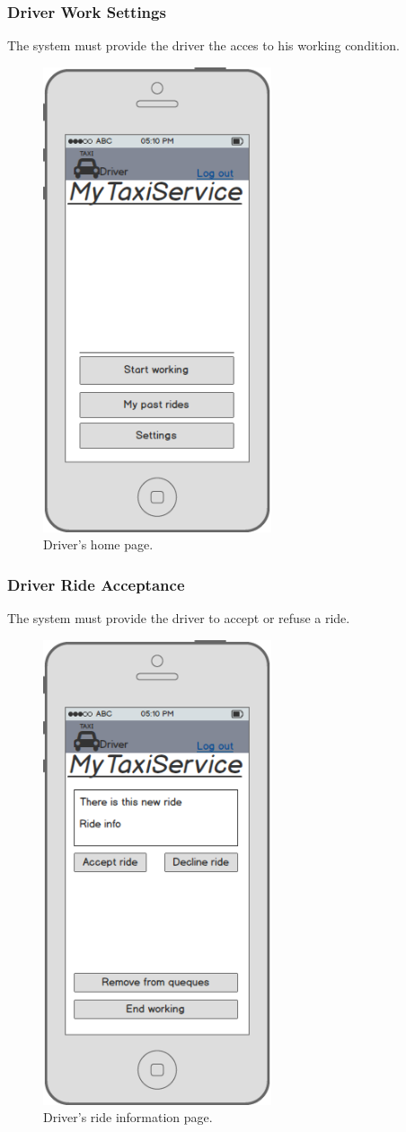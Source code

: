 		\subsubsection {Driver Work Settings}
		 	The system must provide the driver the acces to his working condition.
		 	\begin{figure}[h!]
				\includegraphics[width=0.6\textwidth, width=3cm]{mockup/appdriverlogged}
				\caption{Driver's home page.}
			\end{figure}
			\newpage
		\subsubsection {Driver Ride Acceptance}
			The system must provide the driver to accept or refuse a ride.
		 	\begin{figure}[h!]
				\includegraphics[width=0.6\textwidth, width=3cm]{mockup/appdrivernew}
				\caption{Driver's ride information page.}
			\end{figure}
			\newpage
